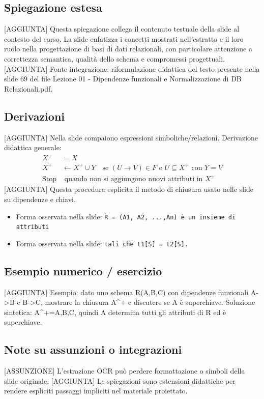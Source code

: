\documentclass[11pt]{article}
\begin{document}
\subsection*{Spiegazione estesa}
[AGGIUNTA] Questa spiegazione collega il contenuto testuale della slide al contesto del corso. La slide enfatizza i concetti mostrati nell'estratto e il loro ruolo nella progettazione di basi di dati relazionali, con particolare attenzione a correttezza semantica, qualità dello schema e compromessi progettuali.
[AGGIUNTA] Fonte integrazione: riformulazione didattica del testo presente nella slide 69 del file Lezione 01 - Dipendenze funzionali e Normalizzazione di DB Relazionali.pdf.
\subsection*{Derivazioni}
[AGGIUNTA] Nella slide compaiono espressioni simboliche/relazioni. Derivazione didattica generale:
\begin{align*}
X^+ &= X \\
X^+ &\leftarrow X^+ \cup Y \quad \text{se } (U \to V) \in F \text{ e } U \subseteq X^+ \text{ con } Y=V \\
\text{Stop} &\text{ quando non si aggiungono nuovi attributi in } X^+
\end{align*}
[AGGIUNTA] Questa procedura esplicita il metodo di chiusura usato nelle slide su dipendenze e chiavi.
\begin{itemize}[leftmargin=*]
\item Forma osservata nella slide: \texttt{R = (A1, A2, ...,An) è un insieme di attributi}
\item Forma osservata nella slide: \texttt{tali che t1[S] = t2[S].}
\end{itemize}
\subsection*{Esempio numerico / esercizio}
[AGGIUNTA] Esempio: dato uno schema R(A,B,C) con dipendenze funzionali A->B e B->C, mostrare la chiusura A^+ e discutere se A è superchiave. Soluzione sintetica: A^+={A,B,C}, quindi A determina tutti gli attributi di R ed è superchiave.
\subsection*{Note su assunzioni o integrazioni}
[ASSUNZIONE] L'estrazione OCR può perdere formattazione o simboli della slide originale.
[AGGIUNTA] Le spiegazioni sono estensioni didattiche per rendere espliciti passaggi impliciti nel materiale proiettato.
\end{document}

